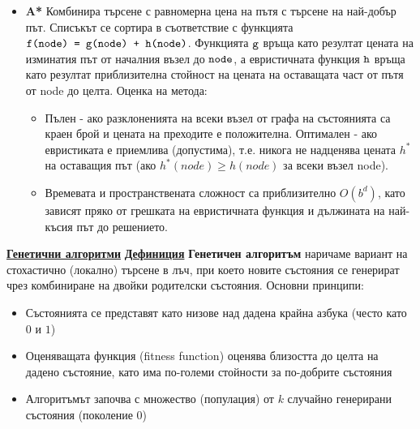 \documentclass{article}
\newcommand{\cppplain}[1]{\textcolor{black}{\texttt{#1}}}
\begin{document}
\begin{itemize}
\begin{itemize}
        \item Пространствена сложност: $O(b)$ - константа
    \end{itemize}
    \item \textbf{A*} \newline\newline
    Комбинира търсене с равномерна цена на пътя с търсене на най-добър път. Списъкът се сортира в съответствие с функцията \newline
    $\cppplain{f(node) = g(node) + h(node)}$. Функцията $\cppplain{g}$ връща като резултат цената на изминатия път от началния възел до $\cppplain{node}$,
    а евристичната функция $\cppplain{h}$ връща като резултат приблизителна стойност на цената на оставащата част от пътя от node до целта. \newline\newline
    Оценка на метода:
    \begin{itemize}
        \item Пълен - ако разклоненията на всеки възел от графа на състоянията са краен брой и цената на преходите е положителна. \newline
        Оптимален - ако евристиката е приемлива (допустима), т.е. никога не надценява цената $h^*$ на оставащия път (ако $h^*(node) \ge h(node)$
        за всеки възел node).
        \item Времевата и пространствената сложност са приблизително $O(b^d)$, като зависят пряко от грешката на
        евристичната функция и дължината на най-късия път до решението.
    \end{itemize}
\end{itemize}
\textbf{\underline{Генетични алгоритми}} \newline\newline
\textbf{\underline{Дефиниция}}
\textbf{Генетичен алгоритъм} наричаме вариант на стохастично (локално) търсене в лъч, при което новите състояния се генерират чрез
комбиниране на двойки родителски състояния. \newline\newline
Основни принципи:
\begin{itemize}
    \item Състоянията се представят като низове над дадена крайна азбука (често като $0$ и $1$)
    \item Оценяващата функция (fitness function) оценява близостта до целта на дадено състояние, като има по-големи стойности
    за по-добрите състояния
    \item Алгоритъмът започва с множество (популация) от $k$ случайно генерирани състояния (поколение 0)
\end{itemize}
\end{document}
